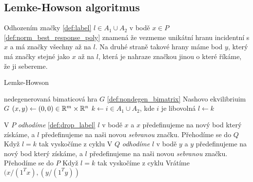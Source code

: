 \subsection{Lemke-Howson algoritmus}
\begin{definition}
\label{def:drop_label}
Odhozením značky \ref{def:label} $l \in A_1 \cup A_2$ v bodě $x \in P$ \ref{def:norm_best_response_poly} znamená že vezmeme unikátní hranu incidentní s $x$ a má značky všechny až na $l$. 
Na druhé straně takové hrany máme bod $y$, který má značky stejné jako $x$ až na $l$, která je nahraze značkou jinou o které říkáme, že ji sebereme. 
\end{definition}

\begin{algorithm}
    \algrenewcommand{}
    \algrenewcommand{}
    \caption{Lemke-Howson}
    \label{alg:lemke_howson}
    \begin{algorithmic}[1]
        \Require  nedegenerovaná bimaticová hra $G$ \ref{def:nondegen_bimatrix}
        \Ensure  Nashovo ekvilibriuim $G$
        \State $(x,y) \leftarrow (0,0) \in \mathbb{R}^m \times \mathbb{R}^n$
        \State $k \leftarrow i \in A_1 \cup A_2$, kde $i$ je libovolná
        \State $l \leftarrow k$
        
        \State V $P$ \textit{odhodíme} \ref{def:drop_label} $l$ v bodě $x$ a $x$ předefinujeme na nový bod který získáme, a $l$ předefinujeme na naši novou \textit{sebranou} značku. 
        Přehodíme se do $Q$
        \State Když $l = k$ tak vyskočíme z cyklu
        \State V $Q$ \textit{odhodíme} $l$ v bodě $y$ a $y$ předefinujeme na nový bod který získáme, a $l$ předefinujeme na naši novou \textit{sebranou} značku. 
        Přehodíme se do $P$
        \State Když $l = k$ tak vyskočíme z cyklu
        \EndWhile
        \State Vrátíme $(x/(1^Tx), (y/(1^Ty))$
    \end{algorithmic}
\end{algorithm}

